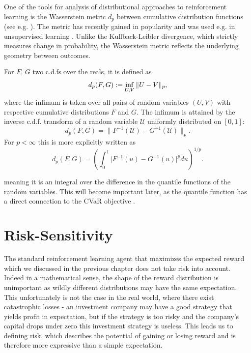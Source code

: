 One of the tools for analysis of distributional approaches to reinforcement learning is the Wasserstein metric $d_p$ between cumulative distribution functions (see e.g. \citet{bickel1981some}). The metric has recently gained in popularity and was used e.g. in unsupervised learning \citep{arjovsky2017wasserstein,bellemare2017cramer}. Unlike the Kullback-Leibler divergence, which strictly measures change in probability, the Wasserstein metric reflects the underlying geometry between outcomes.

For $F$, $G$ two c.d.fs over the reals, it is defined as
\begin{equation*}
d_p(F, G) := \inf_{U, V} \| U - V \|_p,
\end{equation*}
where the infimum is taken over all pairs of random variables $(U, V)$ with respective cumulative distributions $F$ and $G$. The infimum is attained by the inverse c.d.f. transform of a random variable $\mathcal{U}$ uniformly distributed on $[0, 1]$:
\begin{equation*}
d_p(F, G) = \| F^{-1}(\mathcal{U}) - G^{-1}(\mathcal{U}) \|_p .
\end{equation*}
For $p < \infty$ this is more explicitly written as
\begin{equation}
d_p(F, G) = \left ( \int_0^1 \big | F^{-1}(u) - G^{-1}(u) \big |^p du \right )^{1/p} .
\end{equation}

meaning it is an integral over the difference in the quantile functions of the random variables. This will become important later, as the quantile function has a direct connection to the CVaR objective .




\section{Risk-Sensitivity}\label{sec:prelim:risk}

The standard reinforcement learning agent that maximizes the expected reward which we discussed in the previous chapter does not take risk into account. Indeed in a mathematical sense, the shape of the reward distribution is unimportant as wildly different distributions may have the same expectation. This unfortunately is not the case in the real world, where there exist catastrophic losses - an investment company may have a good strategy that yields profit in expectation, but if the strategy is too risky and the company's capital drops under zero this investment strategy is useless. This leads us to defining risk, which describes the potential of gaining or losing reward and is therefore more expressive than a simple expectation.

